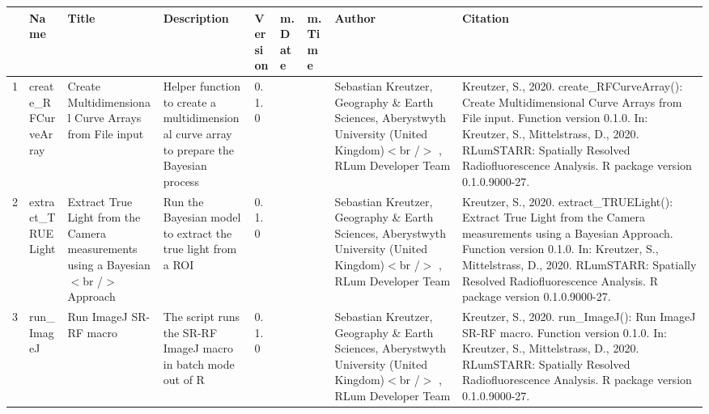 \begin{table}[ht]
\centering
\begin{tabular}{rllllllll}
  \hline
 & Name & Title & Description & Version & m.Date & m.Time & Author & Citation \\ 
  \hline
1 & create\_RFCurveArray & Create Multidimensional Curve Arrays from File input & Helper function to create a multidimensional curve array to prepare the Bayesian process & 0.1.0
 &  &  & Sebastian Kreutzer, Geography \& Earth Sciences, Aberystwyth University (United Kingdom)$<$br /$>$ , RLum Developer Team & Kreutzer, S., 2020. create\_RFCurveArray(): Create Multidimensional Curve Arrays from File input. Function version 0.1.0. In: Kreutzer, S., Mittelstrass, D., 2020. RLumSTARR: Spatially Resolved Radiofluorescence Analysis. R package version 0.1.0.9000-27. 
 \\ 
  2 & extract\_TRUELight & Extract True Light from the Camera measurements using a Bayesian$<$br /$>$ Approach & Run the Bayesian model to extract the true light from a ROI & 0.1.0
 &  &  & Sebastian Kreutzer, Geography \& Earth Sciences, Aberystwyth University (United Kingdom)$<$br /$>$ , RLum Developer Team & Kreutzer, S., 2020. extract\_TRUELight(): Extract True Light from the Camera measurements using a Bayesian Approach. Function version 0.1.0. In: Kreutzer, S., Mittelstrass, D., 2020. RLumSTARR: Spatially Resolved Radiofluorescence Analysis. R package version 0.1.0.9000-27. 
 \\ 
  3 & run\_ImageJ & Run ImageJ SR-RF macro & The script runs the SR-RF ImageJ macro in batch mode out of R & 0.1.0
 &  &  & Sebastian Kreutzer, Geography \& Earth Sciences, Aberystwyth University (United Kingdom)$<$br /$>$ , RLum Developer Team & Kreutzer, S., 2020. run\_ImageJ(): Run ImageJ SR-RF macro. Function version 0.1.0. In: Kreutzer, S., Mittelstrass, D., 2020. RLumSTARR: Spatially Resolved Radiofluorescence Analysis. R package version 0.1.0.9000-27. 
 \\ 
   \hline
\end{tabular}
\end{table}

